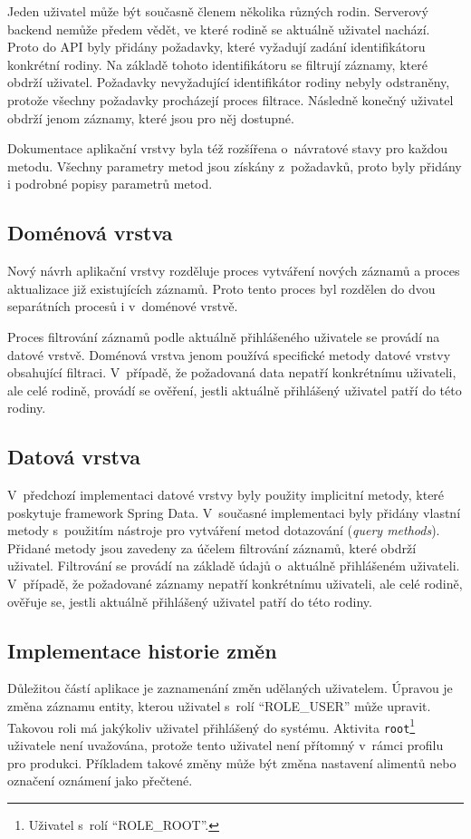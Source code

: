         
        Jeden uživatel může být současně členem několika různých rodin. Serverový backend nemůže předem vědět, ve které rodině se aktuálně uživatel nachází. Proto do API byly přidány požadavky, které vyžadují zadání identifikátoru konkrétní rodiny. Na základě tohoto identifikátoru se filtrují záznamy, které obdrží uživatel. Požadavky nevyžadující identifikátor rodiny nebyly odstraněny, protože všechny požadavky procházejí proces filtrace. Následně konečný uživatel obdrží jenom záznamy, které jsou pro něj dostupné.
        
        
        Dokumentace aplikační vrstvy byla též rozšířena o~návratové stavy pro každou metodu. Všechny parametry metod jsou získány z~požadavků, proto byly přidány i podrobné popisy parametrů metod. 
        
    \subsection{Doménová vrstva}%
        Nový návrh aplikační vrstvy rozděluje proces vytváření nových záznamů a proces aktualizace již existujících záznamů. Proto tento proces byl rozdělen do dvou separátních procesů i v~doménové vrstvě.
        
        
        Proces filtrování záznamů podle aktuálně přihlášeného uživatele se provádí na datové vrstvě. Doménová vrstva jenom používá specifické metody datové vrstvy obsahující filtraci. V~případě, že požadovaná data nepatří konkrétnímu uživateli, ale celé rodině, provádí se ověření, jestli aktuálně přihlášený uživatel patří do této rodiny.
        
    \subsection{Datová vrstva}
        V~předchozí implementaci datové vrstvy byly použity implicitní metody, které poskytuje framework Spring Data. V~současné implementaci byly přidány vlastní metody s~použitím nástroje pro vytváření metod dotazování (\textit{query methods}). Přidané metody jsou zavedeny za účelem filtrování záznamů, které obdrží uživatel. Filtrování se provádí na základě údajů o~aktuálně přihlášeném uživateli.
        V~případě, že požadované záznamy nepatří konkrétnímu uživateli, ale celé rodině, ověřuje se, jestli aktuálně přihlášený uživatel patří do této rodiny.
    
    \subsection{Implementace historie změn}
        Důležitou částí aplikace je zaznamenání změn udělaných uživatelem. Úpravou je změna záznamu entity, kterou uživatel s~rolí \enquote{ROLE\_USER} může upravit. Takovou roli má jakýkoliv uživatel přihlášený do systému. Aktivita \texttt{root}\footnote{Uživatel s~rolí \enquote{ROLE\_ROOT}.} uživatele není uvažována, protože tento uživatel není přítomný v~rámci profilu pro produkci. Příkladem takové změny může být změna nastavení alimentů nebo označení oznámení jako přečtené.
    
